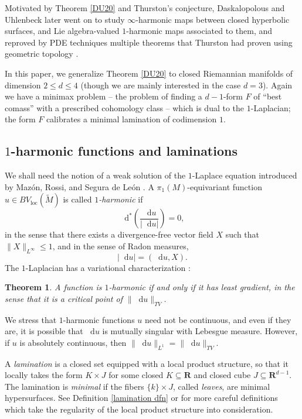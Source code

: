 \documentclass[reqno,11pt]{amsart}
\newcommand{\RR}{\mathbf{R}}
\newcommand*\dif{\mathop{}\!\mathrm{d}}
\newcommand{\dfn}[1]{\emph{#1}\index{#1}}
\newcommand{\loc}{\mathrm{loc}}
\newtheorem{theorem}{Theorem}[section]
\theoremstyle{definition}
\numberwithin{equation}{section}
\begin{document}
Motivated by Theorem \ref{DU20} and Thurston's conjecture, Daskalopolous and Uhlenbeck later went on to study $\infty$-harmonic maps between closed hyperbolic surfaces, and Lie algebra-valued $1$-harmonic maps associated to them, and reproved by PDE techniques multiple theorems that Thurston had proven using geometric topology \cite{daskalopoulos2022,daskalopoulos2023}.

In this paper, we generalize Theorem \ref{DU20} to closed Riemannian manifolds of dimension $2 \leq d \leq 4$ (though we are mainly interested in the case $d = 3$).
Again we have a minimax problem -- the problem of finding a $d-1$-form $F$ of ``best comass'' with a prescribed cohomology class -- which is dual to the $1$-Laplacian; the form $F$ calibrates a minimal lamination of codimension $1$.

\subsection{\texorpdfstring{$1$-harmonic}{1-harmonic} functions and laminations}\label{1 harmonic functions}
We shall need the notion of a weak solution of the $1$-Laplace equation introduced by Maz\'on, Rossi, and Segura de Le\'on \cite{Mazon14}.
A $\pi_1(M)$-equivariant function $u \in BV_\loc(\tilde M)$ is called \dfn{$1$-harmonic} if
$$\dif^* \left(\frac{\dif u}{|\dif u|}\right) = 0,$$
in the sense that there exists a divergence-free vector field $X$ such that $\|X\|_{L^\infty} \leq 1$, and in the sense of Radon measures,
$$|\dif u| = (\dif u, X).$$
The $1$-Laplacian has a variational characterization \cite{Mazon14}:

\begin{theorem}\label{least gradient}
A function is $1$-harmonic if and only if it has least gradient, in the sense that it is a critical point of $\|\dif u\|_{TV}$.
\end{theorem}

We stress that $1$-harmonic functions $u$ need not be continuous, and even if they are, it is possible that $\dif u$ is mutually singular with Lebesgue measure.
However, if $u$ is absolutely continuous, then $\|\dif u\|_{L^1} = \|\dif u\|_{TV}$.

A \dfn{lamination} is a closed set equipped with a local product structure, so that it locally takes the form $K \times J$ for some closed $K \subseteq \RR$ and closed cube $J \subseteq \RR^{d - 1}$.
The lamination is \dfn{minimal} if the fibers $\{k\} \times J$, called \dfn{leaves}, are minimal hypersurfaces.
See Definition \ref{lamination dfn} or \cite[\S1]{BackusCML} for more careful definitions which take the regularity of the local product structure into consideration.
\end{document}
